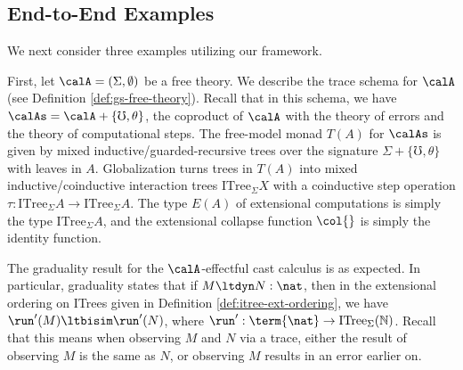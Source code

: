 \documentclass[acmsmall,screen,review,anonymous]{acmart}
\theoremstyle{remark}
\begin{document}
\subsection{End-to-End Examples}\label{sec:framework-examples}

We next consider three examples utilizing our framework. 
%
\begin{example}\label{ex:free-theories}

  First, let $\calA = (\Sigma, \emptyset)$ be a free theory. We describe the
  trace schema for $\calA$ (see Definition \ref{def:gs-free-theory}). Recall
  that in this schema, we have $\calAs = \calA + \{ \mho, \theta \}$, the
  coproduct of $\calA$ with the theory of errors and the theory of computational
  steps. The free-model monad $T(A)$ for $\calAs$ is given by mixed
  inductive/guarded-recursive trees over the signature $\Sigma + \{\mho,
  \theta\}$ with leaves in $A$.
  Globalization turns trees in $T(A)$ into mixed inductive/coinductive
  interaction trees $\textrm{ITree}_\Sigma X$ with a coinductive step operation
  $\tau : \textrm{ITree}_\Sigma A \to \textrm{ITree}_\Sigma A$. The type $E(A)$ of
  extensional computations is simply the type $\textrm{ITree}_\Sigma A$, and the
  extensional collapse function $\col{}$ is simply the identity function.
  
  The graduality result for the $\calA$-effectful cast calculus is as expected.  
  In particular, graduality states that if $M \ltdyn N : \nat$, then in the
  extensional ordering on ITrees given in Definition
  \ref{def:itree-ext-ordering}, we have $\run'(M) \ltbisim \run'(N)$, where
  $\run' : \term{\nat} \to \textrm{ITree}_\Sigma(\mathbb{N})$. Recall that this means
  when observing $M$ and $N$ via a trace, either the result of observing $M$ is
  the same as $N$, or observing $M$ results in an error earlier on.


\end{example}
\end{document}

